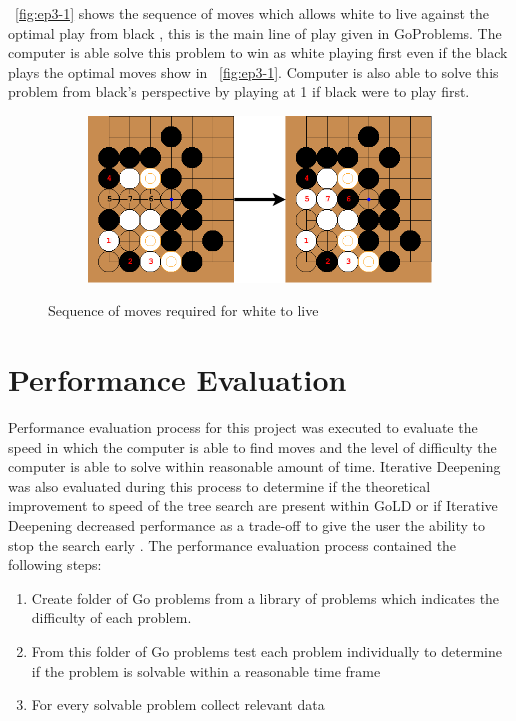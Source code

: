 \documentclass{l4proj}
\begin{document}
~\autoref{fig:ep3-1} shows the sequence of moves which allows white to live against the optimal play from black , this is the main line of play given in GoProblems. The computer is able solve this problem to win as white playing first even if the black plays the optimal moves show in ~\autoref{fig:ep3-1}. Computer is also able to solve this problem from black's perspective by playing at 1 if black were to play first.






\begin{figure}[!h]
\centering
\begin{subfigure}[b]{\textwidth}
\centering
\includegraphics[width=\textwidth]{ep3/ep3-1.png}
\end{subfigure}
\caption{Sequence of moves required for white to live}
\label{fig:ep3-1}
\end{figure}

\section{Performance Evaluation}

Performance evaluation process for this project was executed to evaluate the speed in which the computer is able to find moves and the level of difficulty the computer is able to solve within reasonable amount of time. Iterative Deepening was also evaluated during this process to determine if the theoretical improvement to speed of the tree search are present within GoLD or if Iterative Deepening decreased performance as a trade-off to give the user the ability to stop the search early .
The performance evaluation process contained the following steps:
\begin{enumerate}
\item Create folder of Go problems from a library of problems which indicates the difficulty of each problem.
\item From this folder of Go problems test each problem individually to determine if the problem is solvable within a reasonable time frame
\item For every solvable problem collect relevant data
\end{enumerate}
\end{document}
